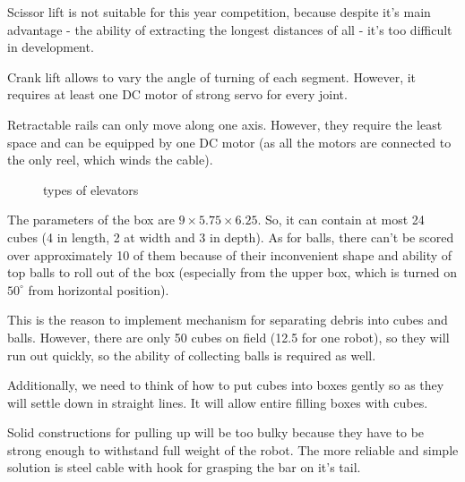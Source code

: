 \begin{enumerate*}
		Scissor lift is not suitable for this year competition, because despite it's main advantage - the ability of extracting the longest distances of all - it's too difficult in development.
		
		Crank lift allows to vary the angle of turning of each segment. However, it requires at least one DC motor of strong servo for every joint.
		
		Retractable rails can only move along one axis. However, they require the least space and can be equipped by one DC motor (as all the motors are connected to the only reel, which winds the cable).
		\begin{figure}[H]
			\begin{minipage}[h]{1\linewidth}
				\caption{types of elevators}
			\end{minipage}
		\end{figure}
		\item The parameters of the box are $9\times5.75\times6.25$. So, it can contain at most 24 cubes (4 in length, 2 at width and 3 in depth). As for balls, there can't be scored over approximately 10 of them because of their inconvenient shape and ability of top balls to roll out of the box (especially from the upper box, which is turned on $50^{\circ}$ from horizontal position).
		
		This is the reason to implement mechanism for separating debris into cubes and balls. However, there are only 50 cubes on field (12.5 for one robot), so they will run out quickly, so the ability of collecting balls is required as well.
		
		Additionally, we need to think of how to put cubes into boxes gently so as they will settle down in straight lines. It will allow entire filling boxes with cubes.\newline
		\item Solid constructions for pulling up will be too bulky because they have to be strong enough to withstand full weight of the robot. The more reliable and simple solution is steel cable with hook for grasping the bar on it's tail.
		

\end{enumerate*}
